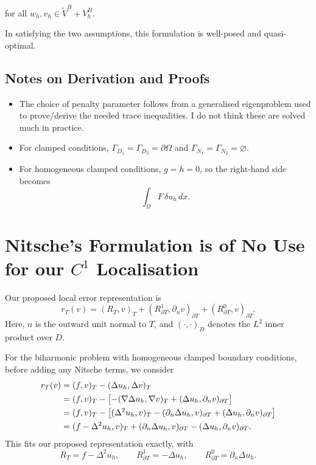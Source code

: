 \documentclass[11pt,a4paper]{article}
\begin{document}
for all $w_h,v_h\in\widetilde V^B+V_h^B$.

In satisfying the two assumptions, this formulation is well-posed and quasi-optimal.

\subsection{Notes on Derivation and Proofs}

\begin{itemize}
    \item The choice of penalty parameter follows from a generalised eigenproblem used to prove/derive the needed trace inequalities. I do not think these are solved much in practice.

    \item For clamped conditions, $\Gamma_{D_1}=\Gamma_{D_2}=\partial\Omega$ and $\Gamma_{N_1}=\Gamma_{N_2}=\varnothing$.

    \item For homogeneous clamped conditions, $g=h=0$, so the right-hand side becomes
    \[
       \int_\Omega F\,\delta u_h\,dx.
    \]
\end{itemize}

\section{Nitsche's Formulation is of No Use for our $C^1$ Localisation}


Our proposed local error representation is
\begin{equation}
  r_T(v)
  = (R_T,v)_T
  + (R_{\partial T}^{1},\partial_n v)_{\partial T}
  + (R_{\partial T}^{0},v)_{\partial T}.
  \label{eq:nitsche-generic-residual}
\end{equation}
Here, $n$ is the outward unit normal to $T$, and $(\cdot,\cdot)_D$
denotes the $L^2$ inner product over $D$. 


For the biharmonic problem with homogeneous clamped boundary conditions,
before adding any Nitsche terms, we consider
\begin{align}
  r_T(v)
  &= (f,v)_T - (\Delta u_h,\Delta v)_T
  \notag\\
  &= (f,v)_T
     - \bigl[-(\nabla\Delta u_h,\nabla v)_T
       + (\Delta u_h,\partial_n v)_{\partial T}\bigr]
  \notag\\
  &= (f,v)_T
     - \bigl[(\Delta^2 u_h,v)_T
       - (\partial_n\Delta u_h,v)_{\partial T}
       + (\Delta u_h,\partial_n v)_{\partial T}\bigr]
  \notag\\
  &= (f-\Delta^2 u_h,v)_T
     + (\partial_n\Delta u_h,v)_{\partial T}
     - (\Delta u_h,\partial_n v)_{\partial T}.
  \label{eq:nitsche-unmodified-residual}
\end{align}
This fits our proposed representation exactly, with
\begin{equation}
  R_T = f-\Delta^2 u_h,
  \qquad
  R_{\partial T}^{1} = -\Delta u_h,
  \qquad
  R_{\partial T}^{0} = \partial_n\Delta u_h.
  \label{eq:nitsche-residual-coefficients}
\end{equation}
\end{document}
